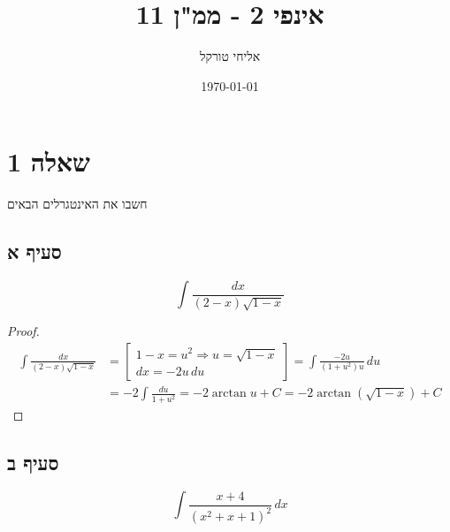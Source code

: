 \documentclass{article}
\title{אינפי 2 - ממ"ן 11}
\author{אליחי טורקל \ID}
\date\today
\begin{document}
	\maketitle %


	\section*{שאלה 1}
	חשבו את האינטגרלים הבאים

	\subsection*{סעיף א}
	\[
		\int \frac{dx}{(2-x)\sqrt{1-x}}
	\]

	\begin{proof}
		\begin{align*}
			\int \frac{dx}{(2-x)\sqrt{1-x}} &=
			\begin{bmatrix}
				1 - x = u^2 \Rightarrow u = \sqrt{1-x} \\
				dx = -2u \, du
			\end{bmatrix}
			= \int \frac{-2u}{(1+u^2)u} \, du \\
			&= -2 \int \frac{du}{1+u^2} = -2\arctan u + C
			= -2\arctan(\sqrt{1-x}) + C
		\end{align*}
	\end{proof}

	\subsection*{סעיף ב}
	\[
		\int \frac{x+4}{(x^2 + x + 1)^2} \, dx
	\]
\end{document}
